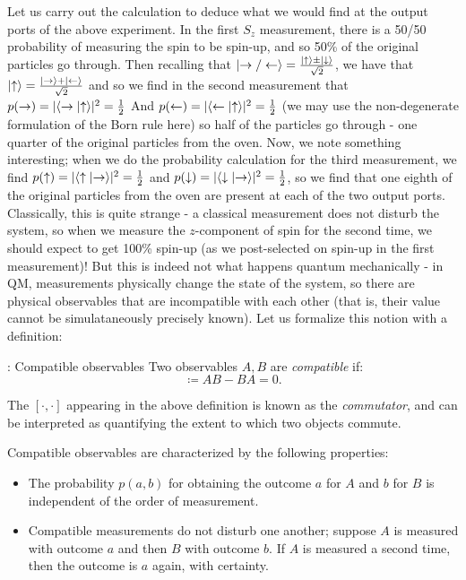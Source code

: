 Let us carry out the calculation to deduce what we would find at the output ports of the above experiment. In the first $S_z$ measurement, there is a 50/50 probability of measuring the spin to be spin-up, and so 50\% of the original particles go through. Then recalling that $\lvert \rightarrow/\leftarrow \rangle = \frac{\lvert \uparrow \rangle \pm \lvert \downarrow \rangle}{\sqrt{2}}$, we have that $\lvert \uparrow \rangle = \frac{\lvert \rightarrow \rangle + \lvert \leftarrow \rangle}{\sqrt{2}}$ and so we find in the second measurement that $p(\rightarrow) = \lvert \langle \rightarrow \lvert \uparrow \rangle \rvert^2 = \frac{1}{2}$ And $p(\leftarrow) = \lvert \langle \leftarrow \lvert \uparrow \rangle \rvert^2 = \frac{1}{2}$ (we may use the non-degenerate formulation of the Born rule here) so half of the particles go through - one quarter of the original particles from the oven. Now, we note something interesting; when we do the probability calculation for the third measurement, we find $p(\uparrow) = \lvert \langle \uparrow \lvert \rightarrow \rangle \rvert^2 = \frac{1}{2}$ and $p(\downarrow) = \lvert \langle \downarrow \lvert \rightarrow \rangle \rvert^2 = \frac{1}{2}$, so we find that one eighth of the original particles from the oven are present at each of the two output ports. Classically, this is quite strange - a classical measurement does not disturb the system, so when we measure the $z$-component of spin for the second time, we should expect to get 100\% spin-up (as we post-selected on spin-up in the first measurement)! But this is indeed not what happens quantum mechanically - in QM, measurements physically change the state of the system, so there are physical observables that are incompatible with each other (that is, their value cannot be simulataneously precisely known). Let us formalize this notion with a definition:

\begin{defbox}{: Compatible observables}
    Two observables $A, B$ are \emph{compatible} if:
    \begin{equation}
        [A, B] \coloneqq AB - BA = 0.
    \end{equation}
\end{defbox}

The $[\cdot, \cdot]$ appearing in the above definition is known as the \emph{commutator}, and can be interpreted as quantifying the extent to which two objects commute.

Compatible observables are characterized by the following properties:
\begin{itemize}
    \item The probability $p(a, b)$ for obtaining the outcome $a$ for $A$ and $b$ for $B$ is independent of the order of measurement.
    \item Compatible measurements do not disturb one another; suppose $A$ is measured with outcome $a$ and then $B$ with outcome $b$. If $A$ is measured a second time, then the outcome is $a$ again, with certainty.
\end{itemize}

